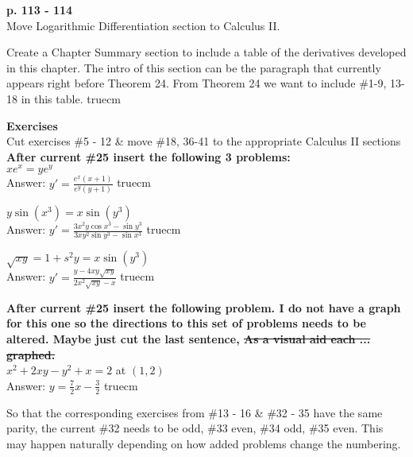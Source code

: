 \documentclass[11pt]{report}
\newlength\tindent
\renewcommand{\indent}{\hspace*{\tindent}}
\begin{document}
\textbf{p. 113 - 114}\\
Move Logarithmic Differentiation section to Calculus II.

Create a Chapter Summary section to include a table of the derivatives developed in this chapter. The intro of this section can be the paragraph that currently appears right before Theorem 24. From Theorem 24 we want to include \#1-9, 13-18 in this table.
 truecm

\textbf{Exercises}\\
Cut exercises \#5 - 12 \& move \#18, 36-41 to the appropriate Calculus II sections\\

\textbf{After current \#25 insert the following 3 problems:}\\

$\displaystyle xe^x = ye^y$\\

\indent Answer: $\displaystyle y'=\frac{e^x(x+1)}{e^y(y+1)}$ truecm

$\displaystyle y\sin(x^3) = x\sin(y^3)$\\

\indent Answer: $\displaystyle y'=\frac{3x^2y\cos x^3 - \sin y^3}{3xy^2\sin y^3 - \sin x^3}$ truecm

$\displaystyle \sqrt{xy} = 1 + s^2y = x\sin(y^3)$\\

\indent Answer: $\displaystyle y'=\frac{y-4xy\sqrt{xy}}{2x^2\sqrt{xy}-x}$ truecm

\textbf{After current \#25 insert the following problem. I do not have a graph for this one so the directions to this set of problems needs to be altered. Maybe just cut the last sentence, \sout{As a visual aid each ... graphed.}}\\

$\displaystyle x^2+2xy - y^2+x=2$ at $(1,2)$\\

\indent Answer: $\displaystyle y=\frac{7}{2}x - \frac{3}{2}$ truecm

So that the corresponding exercises from \#13 - 16 \& \#32 - 35 have the same parity, the current \#32 needs to be odd, \#33 even, \#34 odd, \#35 even. This may happen naturally depending on how added problems change the numbering.\\
\end{document}
